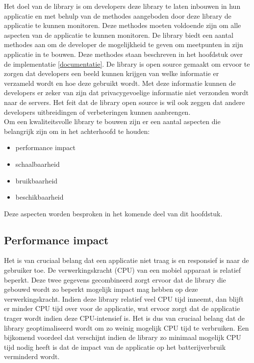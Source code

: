 \noindent Het doel van de library is om developers deze library te laten inbouwen in hun applicatie en met behulp van de methodes aangeboden door deze library de applicatie te kunnen monitoren. Deze methodes moeten voldoende zijn om alle aspecten van de applicatie te kunnen monitoren. De library biedt een aantal methodes aan om de developer de mogelijkheid te geven om meetpunten in zijn applicatie in te bouwen. Deze methodes staan beschreven in het hoofdstuk over de implementatie \ref{documentatie}. De library is open source gemaakt om ervoor te zorgen dat developers een beeld kunnen krijgen van welke informatie er verzameld wordt en hoe deze gebruikt wordt. Met deze informatie kunnen de developers er zeker van zijn dat privacygevoelige informatie niet verzonden wordt naar de servers. Het feit dat de library open source is wil ook zeggen dat andere developers uitbreidingen of verbeteringen kunnen aanbrengen. \\

Om een kwaliteitsvolle library te bouwen zijn er een aantal aspecten die belangrijk zijn om in het achterhoofd te houden:
\begin{itemize}
\item performance impact
\item schaalbaarheid
\item bruikbaarheid
\item beschikbaarheid
\end{itemize}

Deze aspecten worden besproken in het komende deel van dit hoofdstuk. 

\subsection{Performance impact}
Het is van cruciaal belang dat een applicatie niet traag is en responsief is naar de gebruiker toe. De verwerkingskracht (CPU) van een mobiel apparaat is relatief beperkt. Deze twee gegevens gecombineerd zorgt ervoor dat de library die gebouwd wordt zo beperkt mogelijk impact mag hebben op deze verwerkingskracht. Indien deze library relatief veel CPU tijd inneemt, dan blijft er minder CPU tijd over voor de applicatie, wat ervoor zorgt dat de applicatie trager wordt indien deze CPU-intensief is. Het is dus van cruciaal belang dat de library geoptimaliseerd wordt om zo weinig mogelijk CPU tijd te verbruiken. Een bijkomend voordeel dat verschijnt indien de library zo minimaal mogelijk CPU tijd nodig heeft is dat de impact van de applicatie op het batterijverbruik verminderd wordt.  \\

